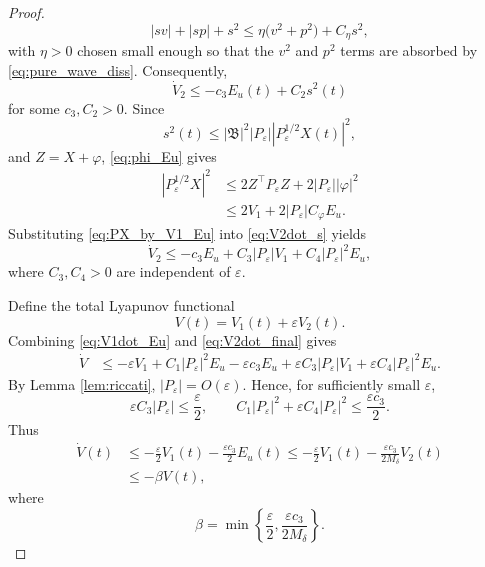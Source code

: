 \documentclass[journal]{IEEEtran}
\newcommand{\eps}{\varepsilon}
\newcommand{\Bcal}{\mathfrak B}
\newcommand{\abs}[1]{\left|#1\right|}
\begin{document}
\begin{proof}
\begin{equation}
 \abs{sv}+\abs{sp}+s^2\le \eta\big(v^2+p^2\big)+C_\eta s^2,
\end{equation}
with $\eta>0$ chosen small enough so that the $v^2$ and $p^2$ terms are absorbed by \eqref{eq:pure_wave_diss}. Consequently,
\begin{equation}
 \dot V_2\le -c_3E_u(t)+C_2s^2(t)\label{eq:V2dot_s}
\end{equation}
for some $c_3,C_2>0$. Since
\begin{equation}
 s^2(t)\le \abs{\Bcal}^2\abs{P_\eps}\abs{P_\eps^{1/2}X(t)}^2,\label{eq:s_bound}
\end{equation}
and $Z=X+\varphi$, \eqref{eq:phi_Eu} gives
\begin{align}
 \abs{P_\eps^{1/2}X}^2
&\le 2Z^\top P_\eps Z+2\abs{P_\eps}\abs{\varphi}^2\nonumber\\
&\le 2V_1+2\abs{P_\eps}C_\varphi E_u.
\label{eq:PX_by_V1_Eu}
\end{align}
Substituting \eqref{eq:PX_by_V1_Eu} into \eqref{eq:V2dot_s} yields
\begin{equation}
 \dot V_2\le -c_3E_u+C_3\abs{P_\eps}V_1+C_4\abs{P_\eps}^2E_u,
\label{eq:V2dot_final}
\end{equation}
where $C_3,C_4>0$ are independent of $\eps$.

Define the total Lyapunov functional
\begin{equation}
 V(t)=V_1(t)+\eps V_2(t).\label{eq:V_total}
\end{equation}
Combining \eqref{eq:V1dot_Eu} and \eqref{eq:V2dot_final} gives
\begin{align}
 \dot V
&\le -\eps V_1+C_1\abs{P_\eps}^2E_u
 -\eps c_3E_u+\eps C_3\abs{P_\eps}V_1
 +\eps C_4\abs{P_\eps}^2E_u.\label{eq:Vdot_combine}
\end{align}
By Lemma \ref{lem:riccati}, $\abs{P_\eps}=O(\eps)$. Hence, for sufficiently small $\eps$,
\begin{equation}
 \eps C_3\abs{P_\eps}\le \frac{\eps}{2},
 \qquad
 C_1\abs{P_\eps}^2+\eps C_4\abs{P_\eps}^2\le \frac{\eps c_3}{2}.
\end{equation}
Thus
\begin{align}
 \dot V(t)&\le -\frac{\eps}{2}V_1(t)-\frac{\eps c_3}{2}E_u(t)
 \le -\frac{\eps}{2}V_1(t)-\frac{\eps c_3}{2M_\delta}V_2(t)\nonumber\\
&\le -\beta V(t),\label{eq:V_decay_final}
\end{align}
where
\begin{equation}
 \beta=\min\left\{\frac{\eps}{2},\frac{\eps c_3}{2M_\delta}\right\}.
\end{equation}


\end{proof}
\end{document}
